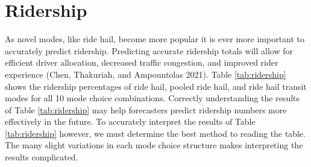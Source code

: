 \documentclass[12pt, oneside, openright]{byuthesis}
\begin{document}
\hypertarget{res-ridership}{%
\section{Ridership}\label{res-ridership}}

As novel modes, like ride hail, become more popular it is ever more important to accurately predict ridership. Predicting accurate ridership totals will allow for efficient driver allocation, decreased traffic congestion, and improved rider experience (Chen, Thakuriah, and Ampountolas 2021). Table \ref{tab:ridership} shows the ridership percentages of ride hail, pooled ride hail, and ride hail transit modes for all 10 mode choice combinations. Correctly understanding the results of Table \ref{tab:ridership} may help forecasters predict ridership numbers more effectively in the future. To accurately interpret the results of Table \ref{tab:ridership} however, we must determine the best method to reading the table. The many slight variations in each mode choice structure makes interpreting the results complicated.

\begin{table}

\caption{\label{tab:ridership}Percent Ride Hail Ridership by Mode Choice Combination Scenario.}
\centering
{}
\end{table}
\end{document}
